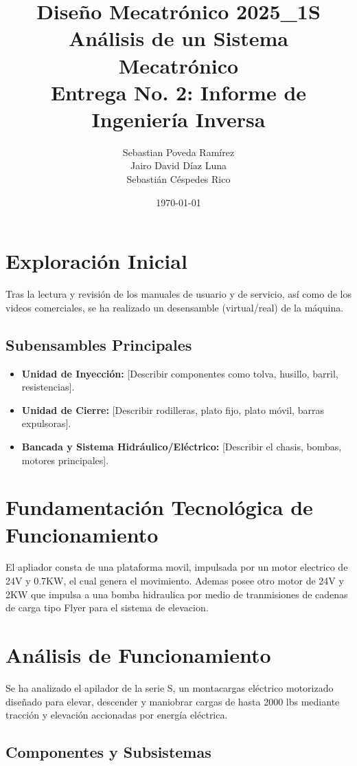 \documentclass[11pt, a4paper]{article}
\title{\textbf{Diseño Mecatrónico 2025\_1S}\\ \Large Análisis de un Sistema Mecatrónico \\ \vspace{0.5cm} \large \textbf{Entrega No. 2: Informe de Ingeniería Inversa}}
\author{
    Sebastian Poveda Ramírez \\ 
    Jairo David Díaz Luna \\ 
    Sebastián Céspedes Rico
}
\date{\today}
\begin{document}
\maketitle
\thispagestyle{empty}
\newpage

\tableofcontents
\newpage

\section{Exploración Inicial}
Tras la lectura y revisión de los manuales de usuario y de servicio, así como de los videos comerciales, se ha realizado un desensamble (virtual/real) de la máquina. 

\subsection{Subensambles Principales}
\begin{itemize}
    \item \textbf{Unidad de Inyección:} [Describir componentes como tolva, husillo, barril, resistencias].
    \item \textbf{Unidad de Cierre:} [Describir rodilleras, plato fijo, plato móvil, barras expulsoras].
    \item \textbf{Bancada y Sistema Hidráulico/Eléctrico:} [Describir el chasis, bombas, motores principales].
\end{itemize}

\section{Fundamentación Tecnológica de Funcionamiento}
El apliador consta de una plataforma movil, impulsada por un motor electrico de 24V y 0.7KW, el cual genera el movimiento. Ademas posee otro motor de 24V y 2KW que impulsa a una bomba hidraulica por medio de tranmisiones de cadenas de carga tipo Flyer para el sistema de elevacion.

\section{Análisis de Funcionamiento}
Se ha analizado el apilador de la serie S, un montacargas eléctrico motorizado diseñado para elevar, descender y maniobrar cargas de hasta 2000 lbs mediante tracción y elevación accionadas por energía eléctrica.

\subsection{Componentes y Subsistemas}
\end{document}
